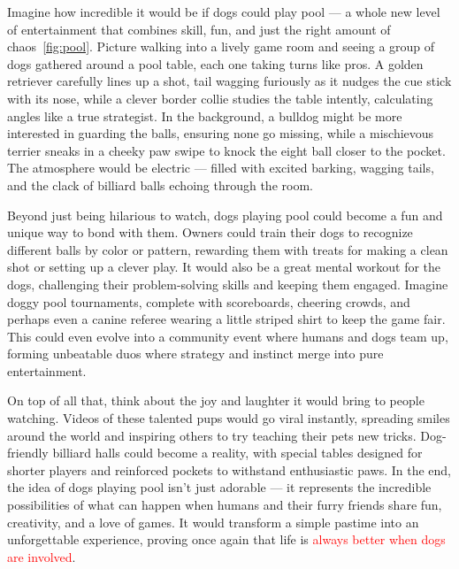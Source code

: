 \documentclass[11pt,a4paper]{report}
\begin{document}
Imagine how incredible it would be if dogs could play pool — a whole new level of entertainment that combines skill, fun, and just the right amount of chaos~\ref{fig:pool}. Picture walking into a lively game room and seeing a group of dogs gathered around a pool table, each one taking turns like pros. A golden retriever carefully lines up a shot, tail wagging furiously as it nudges the cue stick with its nose, while a clever border collie studies the table intently, calculating angles like a true strategist. In the background, a bulldog might be more interested in guarding the balls, ensuring none go missing, while a mischievous terrier sneaks in a cheeky paw swipe to knock the eight ball closer to the pocket. The atmosphere would be electric — filled with excited barking, wagging tails, and the clack of billiard balls echoing through the room.

Beyond just being hilarious to watch, dogs playing pool could become a fun and unique way to bond with them. Owners could train their dogs to recognize different balls by color or pattern, rewarding them with treats for making a clean shot or setting up a clever play. It would also be a great mental workout for the dogs, challenging their problem-solving skills and keeping them engaged. Imagine doggy pool tournaments, complete with scoreboards, cheering crowds, and perhaps even a canine referee wearing a little striped shirt to keep the game fair. This could even evolve into a community event where humans and dogs team up, forming unbeatable duos where strategy and instinct merge into pure entertainment.

On top of all that, think about the joy and laughter it would bring to people watching. Videos of these talented pups would go viral instantly, spreading smiles around the world and inspiring others to try teaching their pets new tricks. Dog-friendly billiard halls could become a reality, with special tables designed for shorter players and reinforced pockets to withstand enthusiastic paws. In the end, the idea of dogs playing pool isn’t just adorable — it represents the incredible possibilities of what can happen when humans and their furry friends share fun, creativity, and a love of games. It would transform a simple pastime into an unforgettable experience, proving once again that life is  \textcolor{red}{always better when dogs are involved}.


  
\end{document}
